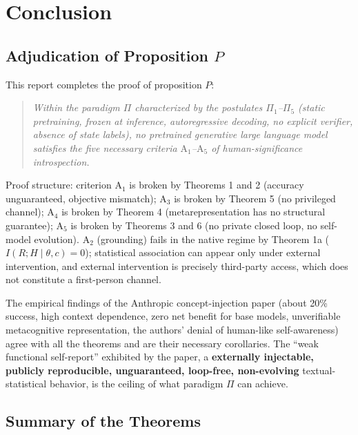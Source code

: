\section{Conclusion}

\subsection{Adjudication of Proposition \texorpdfstring{$P$}{P}}

This report completes the proof of proposition $P$:

\begin{quote}
\itshape
Within the paradigm $\Pi$ characterized by the postulates $\Pi_1$--$\Pi_5$ (static
pretraining, frozen at inference, autoregressive decoding, no explicit verifier, absence of
state labels), no pretrained generative large language model satisfies the five necessary
criteria $\mathrm{A}_1$--$\mathrm{A}_5$ of human-significance introspection.
\end{quote}

Proof structure: criterion $\mathrm{A}_1$ is broken by Theorems 1 and 2 (accuracy
unguaranteed, objective mismatch); $\mathrm{A}_3$ is broken by Theorem 5 (no privileged
channel); $\mathrm{A}_4$ is broken by Theorem 4 (metarepresentation has no structural
guarantee); $\mathrm{A}_5$ is broken by Theorems 3 and 6 (no private closed loop, no
self-model evolution). $\mathrm{A}_2$ (grounding) fails in the native regime by Theorem 1a
($I(R;H\mid\theta,c)=0$); statistical association can appear only under external
intervention, and external intervention is precisely third-party access, which does not
constitute a first-person channel.

The empirical findings of the Anthropic concept-injection paper\cite{lindsey-2026-introspection}
(about 20\% success, high context dependence, zero net benefit for base models, unverifiable
metacognitive representation, the authors' denial of human-like self-awareness) agree with all
the theorems and are their necessary corollaries. The ``weak functional self-report'' exhibited
by the paper, a \textbf{externally injectable, publicly reproducible, unguaranteed,
loop-free, non-evolving} textual-statistical behavior, is the ceiling of what paradigm
$\Pi$ can achieve.

\subsection{Summary of the Theorems}

